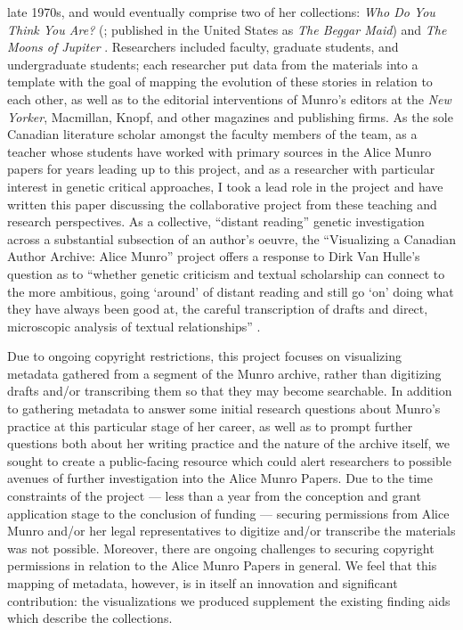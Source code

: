 \begin{paper}
late 1970s, and would eventually comprise two of her collections:
\emph{Who Do You Think You Are?} (\cite{munro_who_1977}; published in the United States
as \emph{The Beggar Maid}) and \emph{The Moons of Jupiter} \citep{munro_moons_1983}.
Researchers included faculty, graduate students, and undergraduate
students; each researcher put data from the materials into a template
with the goal of mapping the evolution of these stories in relation to
each other, as well as to the editorial interventions of Munro's editors
at the \emph{New Yorker}, Macmillan, Knopf, and other magazines and
publishing firms. As the sole Canadian literature scholar amongst the
faculty members of the team, as a teacher whose students have worked
with primary sources in the Alice Munro papers for years leading up to
this project, and as a researcher with particular interest in genetic
critical approaches, I took a lead role in the project and have written
this paper discussing the collaborative project from these teaching and
research perspectives. As a collective, ``distant reading'' genetic
investigation across a substantial subsection of an author's oeuvre, the
``Visualizing a Canadian Author Archive: Alice Munro'' project offers a
response to Dirk Van Hulle's question as to ``whether genetic criticism
and textual scholarship can connect to the more ambitious, going
`around' of distant reading and still go `on' doing what they have
always been good at, the careful transcription of drafts and direct,
microscopic analysis of textual relationships'' \citep[189]{van_hulle_genetic_2022}.

Due to ongoing copyright restrictions, this project focuses on
visualizing metadata gathered from a segment of the Munro archive,
rather than digitizing drafts and/or transcribing them so that
they may become searchable. In addition to gathering metadata to answer some
initial research questions about Munro's practice at this particular
stage of her career, as well as to prompt further questions both about
her writing practice and the nature of the archive itself, we sought to
create a public-facing resource which could alert researchers to
possible avenues of further investigation into the Alice Munro Papers.
Due to the time constraints of the project –– less than a year from the
conception and grant application stage to the conclusion of
funding –– securing permissions from Alice Munro and/or her legal
representatives to digitize and/or transcribe the materials was not
possible. Moreover, there are ongoing challenges to securing copyright
permissions in relation to the Alice Munro Papers in general. We feel
that this mapping of metadata, however, is in itself an innovation and
significant contribution: the visualizations we produced supplement the
existing finding aids which describe the collections.


\end{paper}
